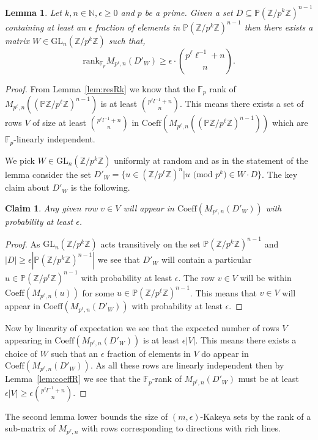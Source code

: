 \documentclass[11pt]{article}
\numberwithin{equation}{section}
\newtheorem{claim}[thm]{Claim}
\newtheorem{lem}[thm]{Lemma}
\def\GL{\text{GL}}
\def\F{{\mathbb{F}}}
\def\Z{{\mathbb{Z}}}
\def\N{{\mathbb{N}}}
\def\P{{\mathbb{P}}}
\def\Coeff{\text{Coeff}}
\begin{document}
\begin{lem}\label{fm:rdRo}
Let $k,n\in \N,\epsilon \ge 0$ and $p$ be a prime. Given a set $D\subseteq \P (\Z/p^k\Z)^{n-1}$  containing at least an $\epsilon$ fraction of elements in $\P (\Z/p^k\Z)^{n-1}$ then there exists a matrix {\em $W\in \GL_n(\Z/p^k\Z)$} such that,
{\em $$\text{rank}_{\F_p} M_{p^\ell,n}(D'_W)\ge \epsilon \cdot \binom{p^\ell \ell^{-1}+n}{n}.$$}
\end{lem}
\begin{proof}
From Lemma~\ref{lem:resRk} we know that the $\F_p$ rank of $M_{p^\ell,n}((\P \Z/p^\ell\Z)^{n-1})$ is at least $\binom{p^\ell l^{-1}+n}{n}$. This means there exists a set of rows $V$ of size at least $\binom{p^\ell l^{-1}+n}{n}$ in $\Coeff(M_{p^\ell,n}((\P \Z/p^\ell\Z)^{n-1}))$ which are $\F_p$-linearly independent.

We pick $W\in \GL_n(\Z/p^k\Z)$ uniformly at random and as in the statement of the lemma consider the set $D'_W=\{u\in (\Z/p^\ell\Z)^{n}| u\text{ (mod }p^k\text{)}\in W\cdot D\}$. The key claim about $D'_W$ is the following.

\begin{claim}
Any given row $v\in V$ will appear in {\em$\Coeff(M_{p^\ell,n}(D'_W))$} with probability at least $\epsilon$.  
\end{claim}
\begin{proof}
As $\GL_n(\Z/p^k\Z)$ acts transitively on the set $\P (\Z/p^k\Z)^{n-1}$ and $|D|\ge \epsilon |\P (\Z/p^k\Z)^{n-1}|$ we see that $D'_W$ will contain a particular $u\in \P (\Z/p^\ell\Z)^{n-1}$ with probability at least $\epsilon$. The row $v\in V$ will be within $\Coeff(M_{p^\ell,n}(u))$ for some $u\in \P (\Z/p^\ell\Z)^{n-1}$. This means that $v\in V$ will appear in $\Coeff(M_{p^\ell,n}(D'_W))$ with probability at least $\epsilon$. 
\end{proof}

Now by linearity of expectation we see that the expected number of rows $V$ appearing in $\Coeff(M_{p^\ell,n}(D'_W))$ is at least $\epsilon|V|$. This means there exists a choice of $W$ such that an $\epsilon$ fraction of elements in $V$ do appear in $\Coeff(M_{p^\ell,n}(D'_W))$. As all these rows are linearly independent then by Lemma~\ref{lem:coeffR} we see that the $\F_p$-rank of $M_{p^\ell,n}(D'_W)$ must be at least $\epsilon|V|\ge \epsilon \binom{p^\ell l^{-1}+n}{n}$.
\end{proof}

The second lemma lower bounds the size of $(m,\epsilon)$-Kakeya sets by the rank of a sub-matrix of $M_{p^\ell, n}$ with rows corresponding to directions with rich lines.
\end{document}
